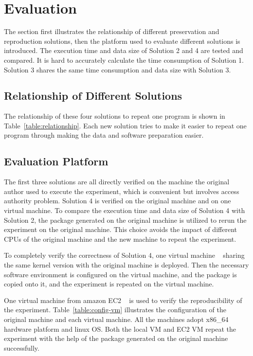\documentclass{sig-alternate}
\begin{document}
\section{Evaluation}
The section first illustrates the relationship of different preservation and reproduction solutions, then the platform used to evaluate different solutions is introduced. The execution time and data size of Solution 2 and 4 are tested and compared. It is hard to accurately calculate the time consumption of Solution 1. Solution 3 shares the same time consumption and data size with Solution 3.

\subsection{Relationship of Different Solutions}
The relationship of these four solutions to repeat one program is shown in Table~\ref{table:relationship}. Each new solution tries to make it easier to repeat one program through making the data and software preparation easier.

\subsection{Evaluation Platform}

The first three solutions are all directly verified on the machine the original
author used to execute the experiment, which is convenient but involves access
authority problem. Solution 4 is verified on the original machine and on one virtual machine.
To compare the execution time and data size of Solution 4
with Solution 2, the package generated on the original machine is utilized to
rerun the experiment on the original machine. This choice avoids the impact of
different CPUs of the original machine and the new machine to repeat the
experiment. 

To completely verify the correctness of Solution 4, one virtual
machine ~\cite{goldberg1974survey} sharing the same kernel version with the original machine is deployed.
Then the necessary software environment is configured on the virtual machine,
and the package is copied onto it, and the
experiment is repeated on the virtual machine.

One virtual machine from amazon EC2 ~\cite{amazon2010amazon} is used to verify the reproducibility of the experiment. Table~\ref{table:config-vm} illustrates the configuration of the original machine and each virtual machine. 
All the machines adopt x86\_64 hardware platform and linux OS.
Both the local VM and EC2 VM repeat the experiment with the help of the package generated on the original machine successfully.
\end{document}

